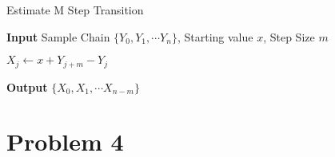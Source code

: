 \documentclass[12pt]{article}
\begin{document}
\begin{algorithm}
	\caption{Estimate M Step Transition}\label{mstepest}
	\hspace*{\algorithmicindent} \textbf{Input} Sample Chain $\{Y_0, Y_1, \cdots Y_n \}$, Starting value $x$, Step Size $m$
	\begin{algorithmic}[1]
		\State $X_j \gets x + Y_{j+m} - Y_{j}$
		\EndFor
	\end{algorithmic}
	\hspace*{\algorithmicindent} \textbf{Output} $\{X_0, X_1, \cdots X_{n-m} \}$
\end{algorithm}


\section*{Problem 4}
\end{document}
